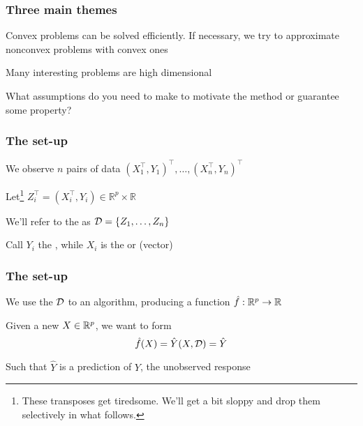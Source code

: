 \documentclass{beamer}
\begin{document}
\begin{frame}
\frametitle{Three main themes}

\vsp
Convex problems can be solved efficiently.  If necessary, we try to approximate nonconvex problems with convex ones

\vvsp
{}

\vsp
Many interesting problems are high dimensional 



\vvsp
{}

\vsp
What assumptions do you need to make to motivate the method or guarantee some property? 
\end{frame}


\begin{frame}
\frametitle{The set-up}

We observe $n$ pairs of data $(X_1^{\top},Y_1)^{\top},\ldots,(X_n^{\top},Y_n)^{\top}$

\vsp

Let\footnote{These transposes get tiredsome.  We'll get a bit sloppy and drop them selectively in what follows.}  
$Z_i^{\top} = (X_i^{\top},Y_i) \in \mathbb{R}^{p}\times\mathbb{R}$

\vsp
We'll refer to the  as $\mathcal{D} = \{ Z_1, \ldots, Z_n\}$

\vsp
Call $Y_i$ the , while $X_i$ is the  or  (vector)

\vvsp
{}

\end{frame}


\begin{frame}
\frametitle{The set-up}
We use the  $\mathcal{D}$ to  an algorithm, producing a 
function $\hat f: \mathbb{R}^p \rightarrow \mathbb{R}$

\vsp
{} Given a new $X \in \mathbb{R}^p$, we want to form 
\[
\hat{f}(X) = \hat{Y}(X,\mathcal{D}) = \hat{Y}
\]

Such that $\hat{Y}$ is a  prediction of $Y$, the unobserved response

\end{frame}
\end{document}
